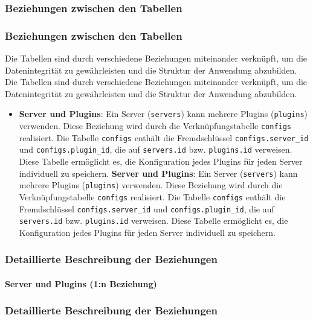 \subsubsection{Beziehungen zwischen den Tabellen}\label{beziehungen-zwischen-den-tabellen}
\subsubsection{Beziehungen zwischen den Tabellen}\label{beziehungen-zwischen-den-tabellen}

Die Tabellen sind durch verschiedene Beziehungen miteinander verknüpft, um die Datenintegrität zu gewährleisten und die Struktur der Anwendung abzubilden.
Die Tabellen sind durch verschiedene Beziehungen miteinander verknüpft, um die Datenintegrität zu gewährleisten und die Struktur der Anwendung abzubilden.

\begin{itemize}
\item
  \textbf{Server und Plugins}: Ein Server (\texttt{servers}) kann mehrere Plugins (\texttt{plugins}) verwenden. Diese Beziehung wird durch die Verknüpfungstabelle \texttt{configs} realisiert. Die Tabelle \texttt{configs} enthält die Fremdschlüssel \texttt{configs.server\_id} und \texttt{configs.plugin\_id}, die auf \texttt{servers.id} bzw. \texttt{plugins.id} verweisen. Diese Tabelle ermöglicht es, die Konfiguration jedes Plugins für jeden Server individuell zu speichern.
  \textbf{Server und Plugins}: Ein Server (\texttt{servers}) kann mehrere Plugins (\texttt{plugins}) verwenden. Diese Beziehung wird durch die Verknüpfungstabelle \texttt{configs} realisiert. Die Tabelle \texttt{configs} enthält die Fremdschlüssel \texttt{configs.server\_id} und \texttt{configs.plugin\_id}, die auf \texttt{servers.id} bzw. \texttt{plugins.id} verweisen. Diese Tabelle ermöglicht es, die Konfiguration jedes Plugins für jeden Server individuell zu speichern.
\end{itemize}

\subsubsection{Detaillierte Beschreibung der Beziehungen}\label{detaillierte-beschreibung-der-beziehungen}

\paragraph{Server und Plugins (1:n Beziehung)}\label{server-und-plugins-1n-beziehung}
\subsubsection{Detaillierte Beschreibung der Beziehungen}\label{detaillierte-beschreibung-der-beziehungen}

